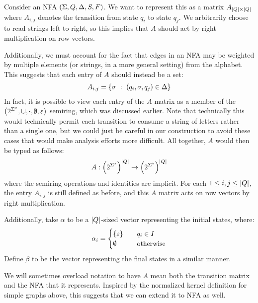 \documentclass[12pt]{article}
\begin{document}
Consider an NFA \(\left(\Sigma, Q, \Delta, S, F\right)\).
We want to represent this as a matrix \(A_{\left\lvert Q\right\rvert \times \left\lvert Q\right\rvert}\)
where \(A_{i, j}\) denotes the transition from state \(q_i\)
to state \(q_j\).
We arbitrarily choose to read strings left to right, so this implies that
\(A\) should act by right multiplication on row vectors.

Additionally, we must account for the fact that edges in an NFA
may be weighted by multiple elements (or strings, in a more general setting)
from the alphabet.
This suggests that each entry of \(A\) should instead be a set:
\begin{align*}
  A_{i, j} =
    \left\{\sigma \  : \  \left(q_i, \sigma, q_j\right) \in \Delta\right\}
\end{align*}
In fact, it is possible to view each entry of the \(A\) matrix
as a member of the
\(\left(2^{\Sigma^\star}, \cup, \cdot, \emptyset, \varepsilon\right)\)
semiring, which was discussed earlier.
Note that technically this would technically permit each transition
to consume a string of letters rather than a single one,
but we could just be careful in our construction to avoid
these cases that would make analysis efforts more difficult.
All together, \(A\) would then be typed as follows:
\begin{align*}
  A : \left(2^{\Sigma^\star}\right)^{\left\lvert Q\right\rvert} \to \left(2^{\Sigma^\star}\right)^{\left\lvert Q\right\rvert}
\end{align*}
where the semiring operations and identities are implicit.
For each \(1 \leq i, j \leq \left\lvert Q\right\rvert\),
the entry \(A_{i, j}\) is still defined as before,
and this \(A\) matrix acts on row vectors by right multiplication.

Additionally, take \(\alpha\) to be a \(\left\lvert Q\right\rvert\)-sized vector
representing the initial states, where:
\begin{align*}
  \alpha_i =
    \begin{cases}
      \left\{\varepsilon\right\} &\quad q_i \in I \\
      \emptyset &\quad \text{otherwise}
    \end{cases}
\end{align*}
Define \(\beta\) to be the vector representing the final states
in a similar manner.

We will sometimes overload notation to have \(A\) mean both the transition
matrix and the NFA that it represents.
Inspired by the normalized kernel definition for simple graphs above,
this suggests that we can extend it to NFA as well.
\end{document}
